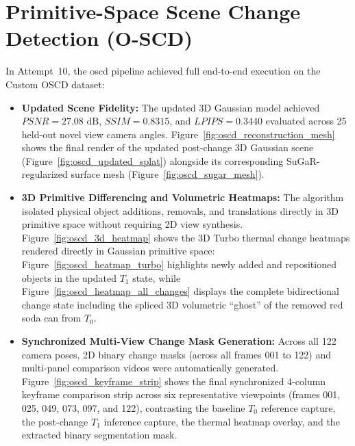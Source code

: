 \section{Primitive-Space Scene Change Detection (O-SCD)}
\label{sec:oscd_results}
In Attempt~10, the \gls{oscd} pipeline achieved full end-to-end execution on the Custom OSCD dataset:
\begin{itemize}
    \item \textbf{Updated Scene Fidelity:} The updated 3D Gaussian model achieved $PSNR = 27.08\text{ dB}$, $SSIM = 0.8315$, and $LPIPS = 0.3440$ evaluated across 25 held-out novel view camera angles. Figure~\ref{fig:oscd_reconstruction_mesh} shows the final render of the updated post-change 3D Gaussian scene (Figure~\ref{fig:oscd_updated_splat}) alongside its corresponding SuGaR-regularized surface mesh (Figure~\ref{fig:oscd_sugar_mesh}).
    \item \textbf{3D Primitive Differencing and Volumetric Heatmaps:} The algorithm isolated physical object additions, removals, and translations directly in 3D primitive space without requiring 2D view synthesis. Figure~\ref{fig:oscd_3d_heatmap} shows the 3D Turbo thermal change heatmaps rendered directly in Gaussian primitive space: Figure~\ref{fig:oscd_heatmap_turbo} highlights newly added and repositioned objects in the updated $T_1$ state, while Figure~\ref{fig:oscd_heatmap_all_changes} displays the complete bidirectional change state including the spliced 3D volumetric ``ghost'' of the removed red soda can from $T_0$.
    \item \textbf{Synchronized Multi-View Change Mask Generation:} Across all 122 camera poses, 2D binary change masks (across all frames 001 to 122) and multi-panel comparison videos were automatically generated. Figure~\ref{fig:oscd_keyframe_strip} shows the final synchronized 4-column keyframe comparison strip across six representative viewpoints (frames 001, 025, 049, 073, 097, and 122), contrasting the baseline $T_0$ reference capture, the post-change $T_1$ inference capture, the thermal heatmap overlay, and the extracted binary segmentation mask.
\end{itemize}

